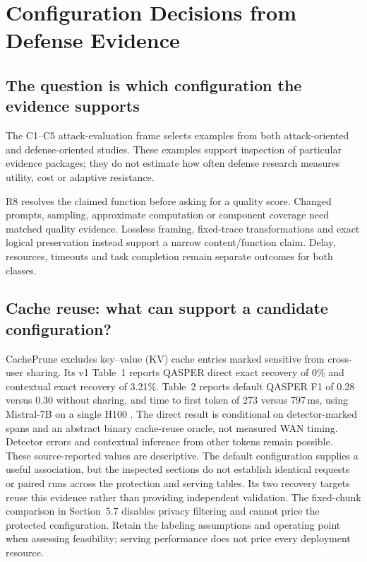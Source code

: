 \section{Configuration Decisions from Defense Evidence}\label{sec:defenses}
\subsection{The question is which configuration the evidence supports}
The C1--C5 attack-evaluation frame selects examples from both attack-oriented and defense-oriented studies. These examples support inspection of particular evidence packages; they do not estimate how often defense research measures utility, cost or adaptive resistance.

R8 resolves the claimed function before asking for a quality score. Changed prompts, sampling, approximate computation or component coverage need matched quality evidence. Lossless framing, fixed-trace transformations and exact logical preservation instead support a narrow content/function claim. Delay, resources, timeouts and task completion remain separate outcomes for both classes.


\subsection{Cache reuse: what can support a candidate configuration?}\label{sec:cache-decisions}
CachePrune excludes key--value (KV) cache entries marked sensitive from cross-user sharing. Its v1 Table~1 reports QASPER direct exact recovery of 0\% and contextual exact recovery of 3.21\%. Table~2 reports default QASPER F1 of 0.28 versus 0.30 without sharing, and time to first token of 273 versus 797\,ms, using Mistral-7B on a single H100 \cite[3.1,5.1--5.2,5.6]{wu2026cacheprune}. The direct result is conditional on detector-marked spans and an abstract binary cache-reuse oracle, not measured WAN timing. Detector errors and contextual inference from other tokens remain possible. These source-reported values are descriptive. The default configuration supplies a useful association, but the inspected sections do not establish identical requests or paired runs across the protection and serving tables. Its two recovery targets reuse this evidence rather than providing independent validation. The fixed-chunk comparison in Section~5.7 disables privacy filtering and cannot price the protected configuration. Retain the labeling assumptions and operating point when assessing feasibility; serving performance does not price every deployment resource.

